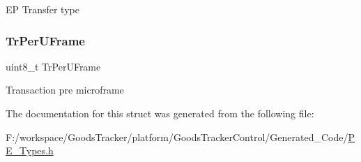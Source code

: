 EP Transfer type \mbox{\label{struct_l_d_d___u_s_b___host___t_pipe_descr___struct_a8f0309cc21c6bdfa8feea4710727439a}} 
\subsubsection{\texorpdfstring{Tr\+Per\+U\+Frame}{TrPerUFrame}}
{\footnotesize\ttfamily uint8\+\_\+t Tr\+Per\+U\+Frame}

Transaction pre microframe 

The documentation for this struct was generated from the following file\+:\begin{DoxyCompactItemize}
\item 
F\+:/workspace/\+Goods\+Tracker/platform/\+Goods\+Tracker\+Control/\+Generated\+\_\+\+Code/\hyperlink{_p_e___types_8h}{P\+E\+\_\+\+Types.\+h}\end{DoxyCompactItemize}
